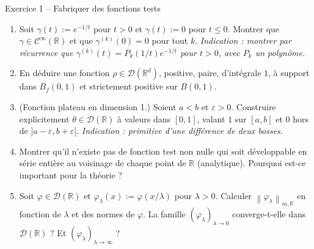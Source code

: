 \documentclass[11pt,a4paper]{article}
\newcommand{\R}{\mathbb{R}}
\newcommand{\Bf}{B_f}
\newcommand{\norm}[1]{\left\|#1\right\|}
\newcommand{\Cinf}{\mathcal{C}^\infty}
\newcommand{\D}{\mathcal{D}}
\theoremstyle{definition}
\begin{document}
\begin{exo}{Exercice 1 -- Fabriquer des fonctions tests}
\begin{enumerate}[label=(\alph*)]
  \item Soit $\gamma(t):=e^{-1/t}$ pour $t>0$ et $\gamma(t):=0$ pour $t\le0$. Montrer que $\gamma\in\Cinf(\R)$ et que $\gamma^{(k)}(0)=0$ pour tout $k$. \emph{Indication : montrer par récurrence que $\gamma^{(k)}(t)=P_k(1/t)e^{-1/t}$ pour $t>0$, avec $P_k$ un polynôme.}
  \item En déduire une fonction $\rho\in\D(\R^d)$, positive, paire, d'intégrale $1$, à support dans $\Bf(0,1)$ et strictement positive sur $B(0,1)$.
  \item (Fonction plateau en dimension 1.) Soient $a<b$ et $\varepsilon>0$. Construire explicitement $\theta\in\D(\R)$ à valeurs dans $[0,1]$, valant $1$ sur $[a,b]$ et $0$ hors de $]a-\varepsilon,b+\varepsilon[$. \emph{Indication : primitive d'une différence de deux bosses.}
  \item Montrer qu'il n'existe pas de fonction test non nulle qui soit développable en série entière au voisinage de chaque point de $\R$ (analytique). Pourquoi est-ce important pour la théorie ?
  \item Soit $\varphi\in\D(\R)$ et $\varphi_\lambda(x):=\varphi(x/\lambda)$ pour $\lambda>0$. Calculer $\norm{\varphi_\lambda}_{m,\R}$ en fonction de $\lambda$ et des normes de $\varphi$. La famille $(\varphi_\lambda)_{\lambda\to0}$ converge-t-elle dans $\D(\R)$ ? Et $(\varphi_\lambda)_{\lambda\to\infty}$ ?
\end{enumerate}
\end{exo}
\end{document}
